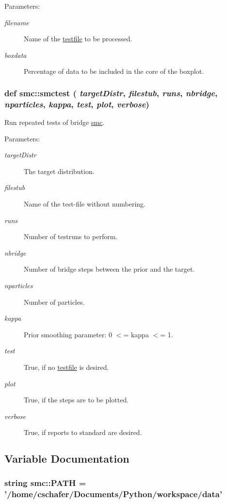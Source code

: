 \begin{Desc}
\item[Parameters:]
\begin{description}
\item[{\em filename}]Name of the \hyperlink{namespacetestfile}{testfile} to be processed. \item[{\em boxdata}]Percentage of data to be included in the core of the boxplot. \end{description}
\end{Desc}
\hypertarget{namespacesmc_90ae893d3420c53ca98ea6d16a27ebf6}{
\subsubsection[{smctest}]{\setlength{\rightskip}{0pt plus 5cm}def smc::smctest ( {\em targetDistr}, \/   {\em filestub}, \/   {\em runs}, \/   {\em nbridge}, \/   {\em nparticles}, \/   {\em kappa}, \/   {\em test}, \/   {\em plot}, \/   {\em verbose})}}
\label{namespacesmc_90ae893d3420c53ca98ea6d16a27ebf6}


Run repeated tests of bridge \hyperlink{namespacesmc}{smc}. 

\begin{Desc}
\item[Parameters:]
\begin{description}
\item[{\em targetDistr}]The target distribution. \item[{\em filestub}]Name of the test-file without numbering. \item[{\em runs}]Number of testruns to perform. \item[{\em nbridge}]Number of bridge steps between the prior and the target. \item[{\em nparticles}]Number of particles. \item[{\em kappa}]Prior smoothing parameter: 0 $<$= kappa $<$= 1. \item[{\em test}]True, if no \hyperlink{namespacetestfile}{testfile} is desired. \item[{\em plot}]True, if the steps are to be plotted. \item[{\em verbose}]True, if reports to standard are desired. \end{description}
\end{Desc}


\subsection{Variable Documentation}
\hypertarget{namespacesmc_e5f7d905ee9ecc1f072955328a069bba}{
\subsubsection[{PATH}]{\setlength{\rightskip}{0pt plus 5cm}string {\bf smc::PATH} = '/home/cschafer/Documents/Python/workspace/{\bf data}'}}
\label{namespacesmc_e5f7d905ee9ecc1f072955328a069bba}


